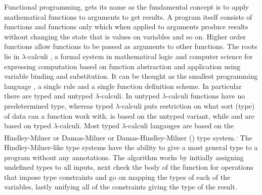 \documentclass[thesis-solanki.tex]{subfiles}
\begin{document}
Functional programming, \cite{hughes1989functional} gets its name as the fundamental concept is
to apply mathematical functions to arguments to get results.
A program itself consists of functions and functions only which when applied to arguments produce results without
changing the state that is values on variables and so on.
Higher order functions allow functions to be passed as arguments to other functions.
The roots lie in $\lambda$-calculi \cite{website:lambdacalculuswiki}, a formal system in mathematical logic and
computer science for expressing computation based on function abstraction and application using variable binding
and substitution.
It can be thought as the smallest programming language \cite{rojas2004tutorial}, a single rule and a single
function definition scheme.
In particular there are typed and untyped $\lambda$-calculi.
In untyped $\lambda$-calculi functions have no predetermined type, whereas typed $\lambda$-calculi puts restriction
on what sort (type) of data can a function work with.
 is based on the untyped variant, while  and  are based on typed
$\lambda$-calculi.
Most typed $\lambda$-calculi langauges are based on the Hindley-Milner or Damas-Milner or Damas-Hindley-Milner
(\cite{hindley1969principal,milner1978theory,website:hdmtypesystemwiki}) type system.\textsuperscript{,}
The Hindley-Milner-like type systems have the ability to give a most general type to a program
without any annotations.
The algorithm \cite{website:hdmtypesystem} works by initially assigning undefined types to all inputs, next check
the body of the function for operations that impose type constraints and go on mapping the types of each of the 
variables, lastly unifying all of the constraints giving the type of the result.
\end{document}
